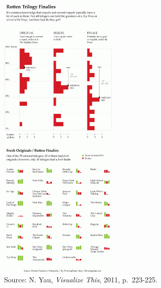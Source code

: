 \documentclass[
  letterpaper,
  DIV=11,
  numbers=noendperiod]{scrreprt}
\begin{document}
\begin{figure}[H]

{\centering \includegraphics[width=0.5\textwidth,height=\textheight]{src/../images/trilogies.png}

}

\caption{Source: N. Yau, \emph{Visualize This}, 2011, p.~223-225.}

\end{figure}%

\hfill\break
\hfill\break
\hfill\break
\end{document}
